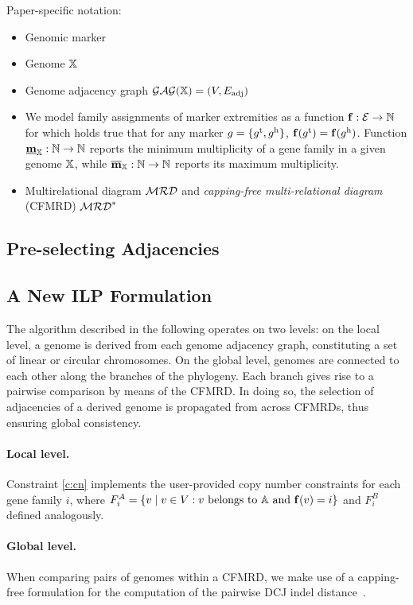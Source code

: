 \documentclass[runningheads]{llncs}
\begin{document}
Paper-specific notation:

\begin{itemize}
    \item Genomic marker 
    \item Genome $\mathbb{X}$
    \item Genome adjacency graph $\mathcal{GAG}(\mathbb{X}) = (V, {E}_\text{adj})$ 
    \item 
We model family assignments of marker extremities as a function $\mathbf{f}: \mathcal{E} \to \mathbb N$ for which holds true that for any marker $g = \{g^{\textnormal{t}}, g^{\textnormal{h}}\}$, $\mathbf{f}(g^{\textnormal{t}}) = \mathbf{f}(g^{\textnormal{h}})$.  
Function 
$\underline{\mathbf{m}}_{\mathbb{X}} : \mathbb N \to \mathbb N$ reports the minimum multiplicity of a gene family in a given genome $\mathbb{X}$, while $\overline{\mathbf{m}}_{\mathbb{X}}: \mathbb N \to \mathbb N$ reports its maximum multiplicity. 
    \item Multirelational diagram $\mathcal{MRD}$ and \emph{capping-free multi-relational diagram} (CFMRD) $\mathcal{MRD}^*$
\end{itemize}
\subsection{Pre-selecting Adjacencies}
\subsection{A New ILP Formulation}
The algorithm described in the following operates on two levels: 
on the local level, a genome is derived from each genome adjacency graph, constituting a set of linear or circular chromosomes. 
On the global level, genomes are connected to each other along the branches of the phylogeny. Each branch gives rise to a pairwise comparison by means of the CFMRD. 
In doing so, the selection of adjacencies of a derived genome is propagated from across CFMRDs, thus ensuring global consistency. 

\paragraph{Local level.} Constraint \ref{c:cn} implements the user-provided copy number constraints for each gene family $i$, where $F^A_i = \{ v \mid v \in V: v \text{ belongs to }\mathbb{A}\text{ and } \mathbf{f}(v) = i\}$ and $F^B_i$ defined analogously. 

\paragraph{Global level.}
When comparing pairs of genomes within a CFMRD, we make use of a capping-free formulation for the computation of the pairwise DCJ indel distance~\cite{BOH-2023}.
\end{document}
